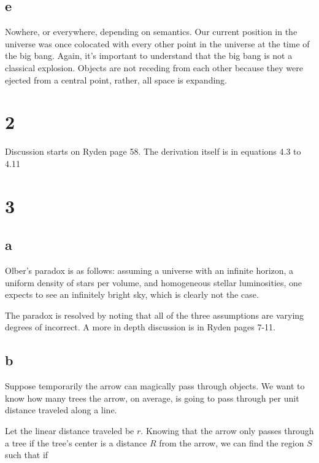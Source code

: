 \documentclass[12pt]{article}
\begin{document}
\subsection*{e}

Nowhere, or everywhere, depending on semantics. Our current position in the universe was once colocated with every other point in the universe at the time of the big bang. Again, it's important to understand that the big bang is not a classical explosion. Objects are not receding from each other because they were ejected from a central point, rather, all space is expanding.


\section*{2}

Discussion starts on Ryden page 58. The derivation itself is in equations 4.3 to 4.11


\section*{3}

\subsection*{a}

Olber's paradox is as follows: assuming a universe with an infinite horizon, a uniform density of stars per volume, and homogeneous stellar luminosities, one expects to see an infinitely bright sky, which is clearly not the case.

The paradox is resolved by noting that all of the three assumptions are varying degrees of incorrect. A more in depth discussion is in Ryden pages 7-11.

\subsection*{b}

Suppose temporarily the arrow can magically pass through objects. We want to know how many trees the arrow, on average, is going to pass through per unit distance traveled along a line.

Let the linear distance traveled be \(r\). Knowing that the arrow only passes through a tree if the tree's center is a distance \(R\) from the arrow, we can find the region \(S\) such that if 
\end{document}
